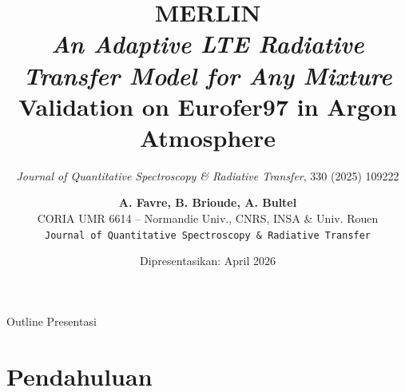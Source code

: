 \documentclass[aspectratio=169, 10pt]{beamer}
\title[MERLIN: LTE Radiative Transfer Code]%
  {\textbf{MERLIN}\\[4pt]
   \textit{An Adaptive LTE Radiative Transfer Model for Any Mixture}\\[2pt]
   \small Validation on Eurofer97 in Argon Atmosphere}
\subtitle{\small\textit{Journal of Quantitative Spectroscopy \& Radiative Transfer}, 330 (2025) 109222}
\author[A. Favre et al.]{%
  \textbf{A. Favre, B. Brioude, A. Bultel}\\[2pt]
  \small CORIA UMR 6614 -- Normandie Univ., CNRS, INSA \& Univ. Rouen\\
  \small \texttt{Journal of Quantitative Spectroscopy \& Radiative Transfer}
}
\date{Dipresentasikan: April 2026}
\begin{document}

\begin{frame}[plain]
  \titlepage
\end{frame}

\begin{frame}{Outline Presentasi}
  \tableofcontents
\end{frame}

\section{Pendahuluan}
\end{document}
